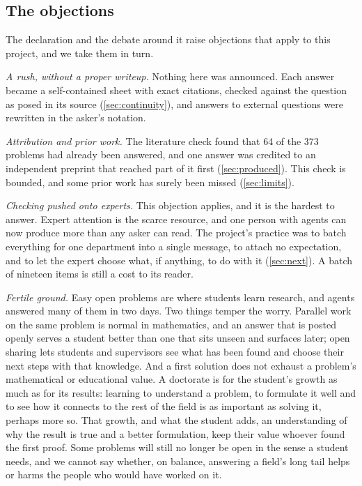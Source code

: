 \documentclass[11pt]{amsart}
\begin{document}
\subsection*{The objections}
The declaration and the debate around it raise objections that apply to this
project, and we take them in turn.

\emph{A rush, without a proper writeup.} Nothing here was announced. Each
answer became a self-contained sheet with exact citations, checked against the
question as posed in its source (\cref{sec:continuity}), and answers to
external questions were rewritten in the asker's notation.\@

\emph{Attribution and prior work.} The literature check found that 64 of the
373 problems had already been answered, and one answer was credited to an
independent preprint that reached part of it first (\cref{sec:produced}). This
check is bounded, and some prior work has surely been missed
(\cref{sec:limits}).\@

\emph{Checking pushed onto experts.} This objection applies, and it is the
hardest to answer. Expert attention is the scarce resource, and one person with
agents can now produce more than any asker can read. The project's practice was
to batch everything for one department into a single message, to attach no
expectation, and to let the expert choose what, if anything, to do with it
(\cref{sec:next}). A batch of nineteen items is still a cost to its reader.\@

\emph{Fertile ground.} Easy open problems are where students learn research,
and agents answered many of them in two days. Two things temper the worry.
Parallel work on the same problem is normal in mathematics, and an answer that
is posted openly serves a student better than one that sits unseen and surfaces
later; open sharing lets students and supervisors see what has been found and
choose their next steps with that knowledge. And a first solution does not
exhaust a problem's mathematical or educational value. A doctorate is for the
student's growth as much as for its results: learning to understand a problem,
to formulate it well and to see how it connects to the rest of the field is as
important as solving it, perhaps more so. That growth, and what the student
adds, an understanding of why the result is true and a better formulation, keep
their value whoever found the first proof. Some problems will still no longer
be open in the sense a student needs, and we cannot say whether, on balance,
answering a field's long tail helps or harms the people who would have worked
on it.\@
\end{document}
